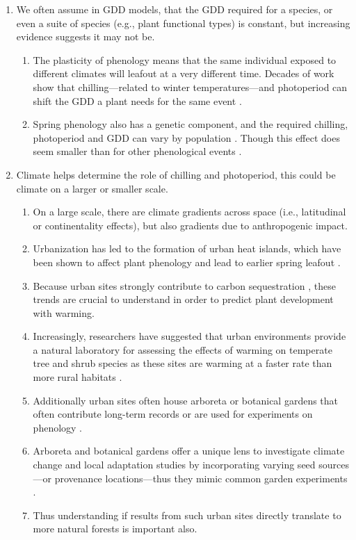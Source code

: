 \documentclass{article}\usepackage[]{graphicx}\usepackage[]{color}
\begin{document}
\begin{enumerate}
\item We often assume in GDD models, that the GDD required for a species, or even a suite of species (e.g., plant functional types) is constant, but increasing evidence suggests it may not be.
  \begin{enumerate} 
  \item The plasticity of phenology means that the same individual exposed to different climates will leafout at a very different time. Decades of work show that chilling---related to winter temperatures---and photoperiod can shift the GDD a plant needs for the same event \citep{Basler2012,Chuine2010,Zohner2016}.
  \item Spring phenology also has a genetic component, and the required chilling, photoperiod and GDD can vary by population \citep{Scotti2004,Cuervo-Alarcon2018}. Though this effect does seem smaller than for other phenological events \citep{McKown2013,Satake2013}.
  \end{enumerate}

\item Climate helps determine the role of chilling and photoperiod, this could be climate on a larger or smaller scale. 
  \begin{enumerate} 
  \item On a large scale, there are climate gradients across space (i.e., latitudinal or continentality effects), but also gradients due to anthropogenic impact. 
  \item Urbanization has led to the formation of urban heat islands, which have been shown to affect plant phenology and lead to earlier spring leafout \citep{Meng2020}. 
  \item Because urban sites strongly contribute to carbon sequestration \citep{Ziter2018}, these trends are crucial to understand in order to predict plant development with warming. 
  \item Increasingly, researchers have suggested that urban environments  provide a natural laboratory for assessing the effects of warming on temperate tree and shrub species as these sites are warming at a faster rate than more rural habitats \citep{Pickett2011, Grimm2008}.
  \item Additionally urban sites often house arboreta or botanical gardens that often contribute long-term records \citep{Zohner2014} or are used for experiments on phenology \citep{Ettinger2018}.
  \item Arboreta and botanical gardens offer a unique lens to investigate climate change and local adaptation studies by incorporating varying seed sources---or provenance locations---thus they mimic common garden experiments \citep{Primack2009}.   \item Thus understanding if results from such urban sites directly translate to more natural forests is important also. 
  \end{enumerate}
  

\end{enumerate}
\end{document}
